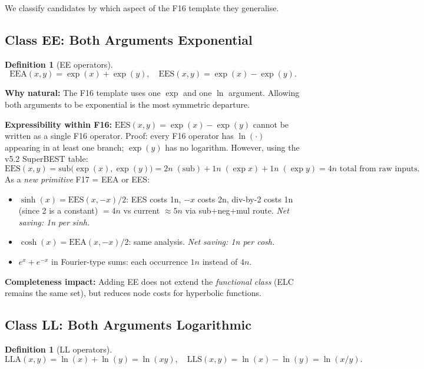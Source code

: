 \documentclass[11pt]{article}
\newtheorem{definition}[theorem]{Definition}
\begin{document}
We classify candidates by which aspect of the F16 template they generalise.

\subsection{Class EE: Both Arguments Exponential}

\begin{definition}[EE operators]
\[
  \mathrm{EEA}(x,y) = \exp(x) + \exp(y), \quad
  \mathrm{EES}(x,y) = \exp(x) - \exp(y).
\]
\end{definition}

\noindent \textbf{Why natural:} The F16 template uses one $\exp$ and one $\ln$ argument.
Allowing both arguments to be exponential is the most symmetric departure.

\noindent \textbf{Expressibility within F16:}
$\mathrm{EES}(x,y) = \exp(x) - \exp(y)$ cannot be written as a single F16 operator.
Proof: every F16 operator has $\ln(\cdot)$ appearing in at least one branch;
$\exp(y)$ has no logarithm. However, using the v5.2 SuperBEST table:
\[
  \mathrm{EES}(x,y) = \mathrm{sub}\!\bigl(\exp(x), \exp(y)\bigr)
  = 2n\;(\text{sub}) + 1n\;(\exp x) + 1n\;(\exp y) = 4n \text{ total from raw inputs}.
\]
As a \emph{new primitive} F17 = EEA or EES:
\begin{itemize}
  \item $\sinh(x) = \mathrm{EES}(x,-x)/2$: EES costs 1n, $-x$ costs 2n, div-by-2 costs
        1n (since 2 is a constant) $= 4n$ vs current $\approx 5n$ via sub+neg+mul route.
        \emph{Net saving: 1n per sinh.}
  \item $\cosh(x) = \mathrm{EEA}(x,-x)/2$: same analysis. \emph{Net saving: 1n per cosh.}
  \item $e^x + e^{-x}$ in Fourier-type sums: each occurrence $1n$ instead of $4n$.
\end{itemize}

\noindent \textbf{Completeness impact:} Adding EE does not extend the \emph{functional class}
(ELC remains the same set), but reduces node costs for hyperbolic functions.

\subsection{Class LL: Both Arguments Logarithmic}

\begin{definition}[LL operators]
\[
  \mathrm{LLA}(x,y) = \ln(x) + \ln(y) = \ln(xy), \quad
  \mathrm{LLS}(x,y) = \ln(x) - \ln(y) = \ln(x/y).
\]
\end{definition}
\end{document}
